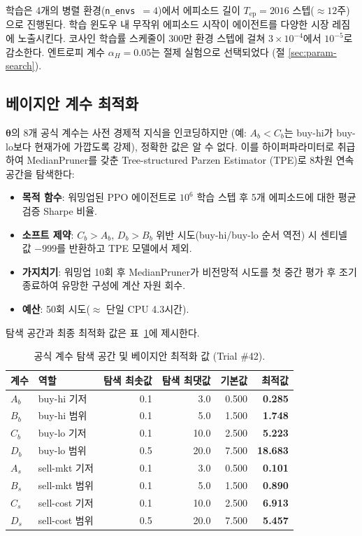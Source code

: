 \documentclass[11pt, a4paper]{article}
\begin{document}
학습은 4개의 병렬 환경(\texttt{n\_envs}~$= 4$)에서 에피소드 길이
$T_\text{ep} = 2016$ 스텝($\approx 12$주)으로 진행된다.
학습 윈도우 내 무작위 에피소드 시작이 에이전트를 다양한 시장 레짐에 노출시킨다.
코사인 학습률 스케줄이 300만 환경 스텝에 걸쳐 $3\times10^{-4}$에서 $10^{-5}$로
감소한다.
엔트로피 계수 $\alpha_H = 0.05$는 절제 실험으로 선택되었다
(절 \ref{sec:param-search}).

\subsection{베이지안 계수 최적화}
\label{sec:bayesian}

$\bm{\theta}$의 8개 공식 계수는 사전 경제적 지식을 인코딩하지만
(예: $A_b < C_b$는 buy-hi가 buy-lo보다 현재가에 가깝도록 강제),
정확한 값은 알 수 없다.
이를 하이퍼파라미터로 취급하여 MedianPruner를 갖춘 Tree-structured Parzen Estimator
(TPE)로 8차원 연속 공간을 탐색한다:

\begin{itemize}
    \item \textbf{목적 함수}: 워밍업된 PPO 에이전트로 $10^6$ 학습 스텝 후
          5개 에피소드에 대한 평균 검증 Sharpe 비율.
    \item \textbf{소프트 제약}: $C_b > A_b$, $D_b > B_b$ 위반 시도(buy-hi/buy-lo
          순서 역전) 시 센티넬 값 $-999$를 반환하고 TPE 모델에서 제외.
    \item \textbf{가지치기}: 워밍업 10회 후 MedianPruner가 비전망적 시도를
          첫 중간 평가 후 조기 종료하여 유망한 구성에 계산 자원 회수.
    \item \textbf{예산}: 50회 시도($\approx$ 단일 CPU 4.3시간).
\end{itemize}

탐색 공간과 최종 최적화 값은 표~\ref{tab:coefs}에 제시한다.

\begin{table}[h]
\centering
\caption{공식 계수 탐색 공간 및 베이지안 최적화 값 (Trial \#42).}
\label{tab:coefs}
\setlength{\tabcolsep}{6pt}
\begin{tabular}{llrrrr}
\toprule
계수 & 역할 & 탐색 최솟값 & 탐색 최댓값 & \textbf{기본값} & \textbf{최적값} \\
\midrule
$A_b$ & buy-hi 기저 & 0.1 & 3.0 & 0.500 & \textbf{0.285} \\
$B_b$ & buy-hi 범위 & 0.1 & 5.0 & 1.500 & \textbf{1.748} \\
$C_b$ & buy-lo 기저 & 0.1 & 10.0 & 2.500 & \textbf{5.223} \\
$D_b$ & buy-lo 범위 & 0.5 & 20.0 & 7.500 & \textbf{18.683} \\
$A_s$ & sell-mkt 기저 & 0.1 & 3.0 & 0.500 & \textbf{0.101} \\
$B_s$ & sell-mkt 범위 & 0.1 & 5.0 & 1.500 & \textbf{0.890} \\
$C_s$ & sell-cost 기저 & 0.1 & 10.0 & 2.500 & \textbf{6.913} \\
$D_s$ & sell-cost 범위 & 0.5 & 20.0 & 7.500 & \textbf{5.457} \\
\bottomrule
\end{tabular}
\end{table}
\end{document}
